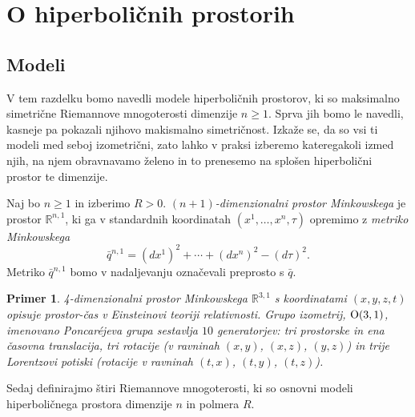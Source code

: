 \documentclass[a4paper]{article}
\newtheorem{primer}{Primer}
\begin{document}
\section{O hiperboličnih prostorih}
\subsection{Modeli}

V tem razdelku bomo navedli modele hiperboličnih prostorov, ki so maksimalno simetrične Riemannove mnogoterosti dimenzije $n \geq 1$. Sprva jih bomo le navedli, kasneje pa pokazali njihovo makismalno simetričnost. Izkaže se, da so vsi ti modeli med seboj izometrični, zato lahko v praksi izberemo kateregakoli izmed njih, na njem obravnavamo želeno in to prenesemo na splošen hiperbolični prostor te dimenzije.

Naj bo $n \geq 1$ in izberimo $R>0$.
\emph{$(n+1)$-dimenzionalni prostor Minkowskega} je prostor $\mathbb{R}^{n,1}$, ki ga v standardnih koordinatah $(x^{1}, \dots , x^{n}, \tau)$ opremimo z \emph{metriko Minkowskega}
\begin{equation}\label{eq:Mink metrika}
\bar{q}^{n,1} = (dx^{1})^2 + \cdots + (dx^{n})^2 - (d\tau)^2.
\end{equation}
Metriko $\bar{q}^{n,1}$ bomo v nadaljevanju označevali preprosto s $\bar{q}$.

\begin{primer}
4-dimenzionalni prostor Minkowskega $\mathbb{R}^{3,1}$ s koordinatami $(x,y,z,t)$ opisuje prostor-čas v Einsteinovi teoriji relativnosti. Grupo izometrij, $\textup{O}(3,1)$, imenovano \emph{Poncar\'ejeva grupa} sestavlja $10$ generatorjev: tri prostorske in ena časovna translacija, tri rotacije (v ravninah $(x,y)$, $(x,z)$, $(y,z)$) in trije Lorentzovi potiski (rotacije v ravninah $(t,x)$, $(t,y)$, $(t,z)$).
\end{primer}

Sedaj definirajmo štiri Riemannove mnogoterosti, ki so osnovni modeli hiperboličnega prostora dimenzije $n$ in polmera $R$.
\end{document}
